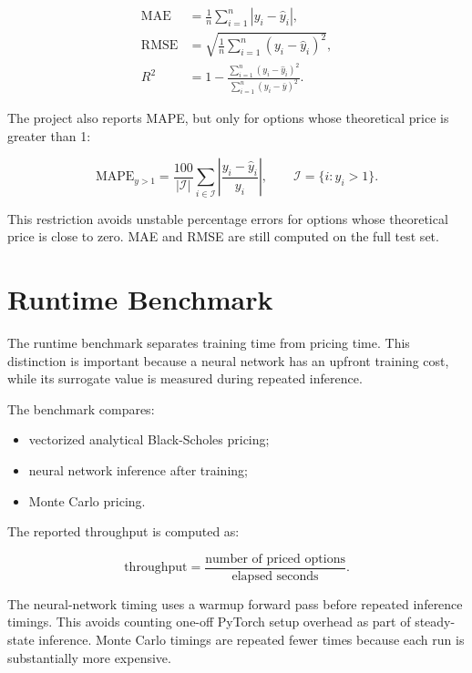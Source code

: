 \begin{align}
    \mathrm{MAE}
    &=
    \frac{1}{n}
    \sum_{i=1}^{n}
    |y_i - \hat{y}_i|, \\
    \mathrm{RMSE}
    &=
    \sqrt{
        \frac{1}{n}
        \sum_{i=1}^{n}
        (y_i - \hat{y}_i)^2
    }, \\
    R^2
    &=
    1
    -
    \frac{\sum_{i=1}^{n}(y_i-\hat{y}_i)^2}
         {\sum_{i=1}^{n}(y_i-\bar{y})^2}.
\end{align}

The project also reports MAPE, but only for options whose theoretical price is greater than 1:

\begin{equation}
    \mathrm{MAPE}_{y>1}
    =
    \frac{100}{|\mathcal{I}|}
    \sum_{i \in \mathcal{I}}
    \left|
    \frac{y_i-\hat{y}_i}{y_i}
    \right|,
    \qquad
    \mathcal{I} = \{i : y_i > 1\}.
\end{equation}

This restriction avoids unstable percentage errors for options whose theoretical price is close to zero.
MAE and RMSE are still computed on the full test set.

\section{Runtime Benchmark}

The runtime benchmark separates training time from pricing time.
This distinction is important because a neural network has an upfront training cost, while its surrogate value is measured during repeated inference.

The benchmark compares:

\begin{itemize}
    \item vectorized analytical Black-Scholes pricing;
    \item neural network inference after training;
    \item Monte Carlo pricing.
\end{itemize}
The reported throughput is computed as:

\begin{equation}
    \mathrm{throughput}
    =
    \frac{\text{number of priced options}}{\text{elapsed seconds}}.
\end{equation}

The neural-network timing uses a warmup forward pass before repeated inference timings.
This avoids counting one-off PyTorch setup overhead as part of steady-state inference.
Monte Carlo timings are repeated fewer times because each run is substantially more expensive.

